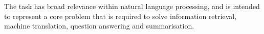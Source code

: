 \documentclass[letterpaper]{article}
\begin{document}
The task has broad relevance within natural language processing, and
is intended to represent a core problem that is required to solve
information retrieval, machine translation, question answering and
summarisation.










\end{document}
